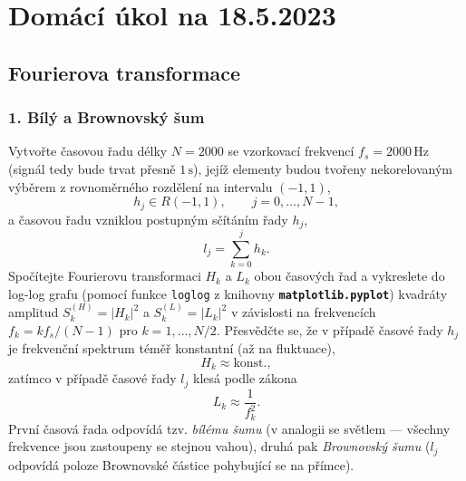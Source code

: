 \documentclass[a4paper,11pt,twoside]{article}
\def\abs#1{\left|#1\right|}
\def\code#1{\textnormal{\texttt{#1}}}
\def\file#1{\textnormal{\textbf{\texttt{#1}}}}
\begin{document}
\section*{Domácí úkol na 18.5.2023}
\subsection*{Fourierova transformace}

\subsubsection*{1. Bílý a Brownovský šum}
    Vytvořte časovou řadu délky $N=2000$ se vzorkovací frekvencí $f_{s}=2000\,\text{Hz}$ (signál tedy bude trvat přesně $1\,\text{s}$), jejíž elementy budou tvořeny nekorelovaným výběrem z rovnoměrného rozdělení na intervalu $(-1,1)$,    
    \begin{equation*}
        h_{j}\in R(-1,1),\qquad j=0,\dotsc,N-1,
    \end{equation*}
    a časovou řadu vzniklou postupným sčítáním řady $h_{j}$,
    \begin{equation*}
        l_{j}=\sum_{k=0}^{j}h_{k}.
    \end{equation*}
    Spočítejte Fourierovu transformaci $H_{k}$ a $L_{k}$ obou časových řad a vykreslete do log-log grafu (pomocí funkce \code{loglog} z knihovny \file{matplotlib.pyplot}) kvadráty amplitud $S_{k}^{(H)}=\abs{H_{k}}^{2}$ a $S_{k}^{(L)}=\abs{L_{k}}^{2}$ v závislosti na frekvencích $f_{k}=k f_{s}/(N-1)$ pro $k=1,\dotsc,N/2$.
    Přesvědčte se, že v případě časové řady $h_{j}$ je frekvenční spektrum téměř konstantní (až na fluktuace), 
    \begin{equation*}
        H_{k}\approx\text{konst.},
    \end{equation*}
    zatímco v případě časové řady $l_{j}$ klesá podle zákona
    \begin{equation*}
        L_{k}\approx\frac{1}{f_{k}^{2}}.
    \end{equation*}
    První časová řada odpovídá tzv. \emph{bílému šumu} (v analogii se světlem --- všechny frekvence jsou zastoupeny se stejnou vahou), druhá pak \emph{Brownovský šumu} ($l_{j}$ odpovídá poloze Brownovské částice pohybující se na přímce).
\end{document}

